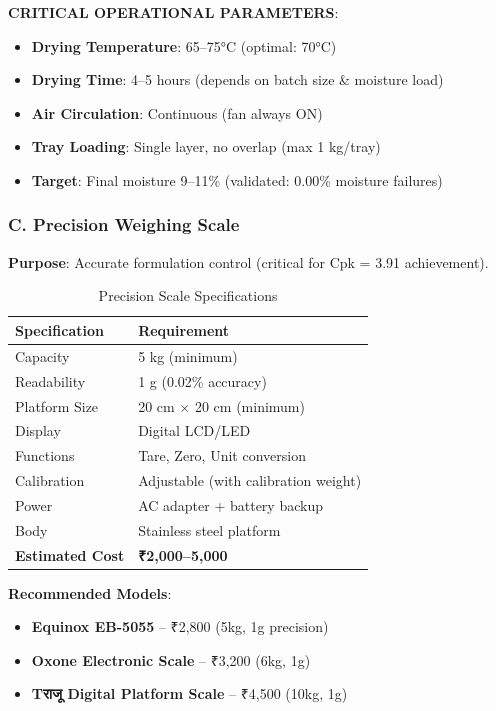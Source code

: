 \documentclass[12pt,a4paper]{article}
\begin{document}
\textbf{CRITICAL OPERATIONAL PARAMETERS}:
\begin{itemize}
    \item \textbf{Drying Temperature}: 65--75°C (optimal: 70°C)
    \item \textbf{Drying Time}: 4--5 hours (depends on batch size \& moisture load)
    \item \textbf{Air Circulation}: Continuous (fan always ON)
    \item \textbf{Tray Loading}: Single layer, no overlap (max 1 kg/tray)
    \item \textbf{Target}: Final moisture 9--11\% (validated: 0.00\% moisture failures)
\end{itemize}

\newpage

\subsubsection{C. Precision Weighing Scale}

\textbf{Purpose}: Accurate formulation control (critical for Cpk = 3.91 achievement).

\begin{table}[h]
\centering
\begin{tabular}{p{5cm}p{8cm}}
\toprule
\textbf{Specification} & \textbf{Requirement} \\
\midrule
Capacity & 5 kg (minimum) \\
Readability & 1 g (0.02\% accuracy) \\
Platform Size & 20 cm $\times$ 20 cm (minimum) \\
Display & Digital LCD/LED \\
Functions & Tare, Zero, Unit conversion \\
Calibration & Adjustable (with calibration weight) \\
Power & AC adapter + battery backup \\
Body & Stainless steel platform \\
\textbf{Estimated Cost} & \textbf{₹2,000--5,000} \\
\bottomrule
\end{tabular}
\caption{Precision Scale Specifications}
\end{table}

\textbf{Recommended Models}:
\begin{itemize}
    \item \textbf{Equinox EB-5055} -- ₹2,800 (5kg, 1g precision)
    \item \textbf{Oxone Electronic Scale} -- ₹3,200 (6kg, 1g)
    \item \textbf{Tराजू Digital Platform Scale} -- ₹4,500 (10kg, 1g)
\end{itemize}
\end{document}

